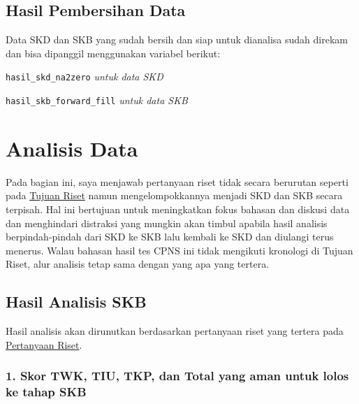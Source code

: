 \documentclass[
]{article}
\begin{document}
\subsection{Hasil Pembersihan Data}\label{hasil-pembersihan-data}

Data SKD dan SKB yang sudah bersih dan siap untuk dianalisa sudah
direkam dan bisa dipanggil menggunakan variabel berikut:

\texttt{hasil\_skd\_na2zero} \emph{untuk data SKD}

\texttt{hasil\_skb\_forward\_fill} \emph{untuk data SKB}

\section{Analisis Data}\label{analisis-data}

Pada bagian ini, saya menjawab pertanyaan riset tidak secara berurutan
seperti pada \hyperref[tujuan-riset]{Tujuan Riset} namun
mengelompokkannya menjadi SKD dan SKB secara terpisah. Hal ini bertujuan
untuk meningkatkan fokus bahasan dan diskusi data dan menghindari
distraksi yang mungkin akan timbul apabila hasil analisis
berpindah-pindah dari SKD ke SKB lalu kembali ke SKD dan diulangi terus
menerus. Walau bahasan hasil tes CPNS ini tidak mengikuti kronologi di
Tujuan Riset, alur analisis tetap sama dengan yang apa yang tertera.

\subsection{Hasil Analisis SKB}\label{hasil-analisis-skb}

Hasil analisis akan dirunutkan berdasarkan pertanyaan riset yang tertera
pada \hyperref[pertanyaan-riset]{Pertanyaan Riset}.

\subsubsection{1. Skor TWK, TIU, TKP, dan Total yang aman untuk lolos ke
tahap
SKB}\label{skor-twk-tiu-tkp-dan-total-yang-aman-untuk-lolos-ke-tahap-skb}
\end{document}
